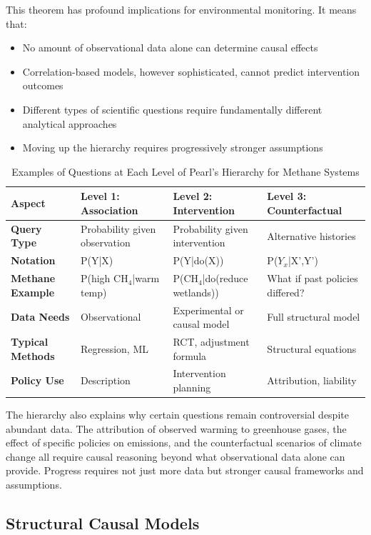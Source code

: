 This theorem has profound implications for environmental monitoring. It means that:
\begin{itemize}
\item No amount of observational data alone can determine causal effects
\item Correlation-based models, however sophisticated, cannot predict intervention outcomes
\item Different types of scientific questions require fundamentally different analytical approaches
\item Moving up the hierarchy requires progressively stronger assumptions
\end{itemize}

\begin{table}[h!]
\centering
\caption{Examples of Questions at Each Level of Pearl's Hierarchy for Methane Systems}
\label{tab:hierarchy_examples}
\begin{tabular}{p{2.5cm}|p{4cm}|p{4cm}|p{4cm}}
\hline
\textbf{Aspect} & \textbf{Level 1: Association} & \textbf{Level 2: Intervention} & \textbf{Level 3: Counterfactual} \\
\hline
\textbf{Query Type} & Probability given observation & Probability given intervention & Alternative histories \\
\textbf{Notation} & P(Y|X) & P(Y|do(X)) & P($Y_x$|X',Y') \\
\textbf{Methane Example} & P(high CH$_4$|warm temp) & P(CH$_4$|do(reduce wetlands)) & What if past policies differed? \\
\textbf{Data Needs} & Observational & Experimental or causal model & Full structural model \\
\textbf{Typical Methods} & Regression, ML & RCT, adjustment formula & Structural equations \\
\textbf{Policy Use} & Description & Intervention planning & Attribution, liability \\
\hline
\end{tabular}
\end{table}

The hierarchy also explains why certain questions remain controversial despite abundant data. The attribution of observed warming to greenhouse gases, the effect of specific policies on emissions, and the counterfactual scenarios of climate change all require causal reasoning beyond what observational data alone can provide. Progress requires not just more data but stronger causal frameworks and assumptions.

\subsection{Structural Causal Models}

